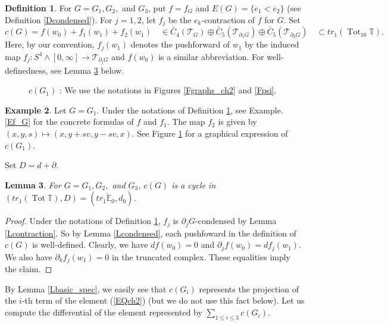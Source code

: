 \documentclass[reqno]{amsart}
\theoremstyle{definition}
\newtheorem{defi}{Definition}[section]
\newtheorem{exa}[defi]{Example}
\theoremstyle{plain}
\newtheorem{lem}[defi]{Lemma}
\newcommand{\TT}{\mathcal{T}} %
\newcommand{\CEE}{\check{\mathbb{E}}}
\newcommand{\TTH}{\mathbb{T}}%
\newcommand{\tot}{\operatorname{Tot}}%
\begin{document}
\begin{defi}\label{Dchain_ch2}
For $G=G_1,G_2,$ and $G_3$, put $f=f_G$ and $E(G)=\{e_1<e_2\}$ (see Definition \ref{Dcondensed}). For $j=1, 2$, let $f_j$ be the $e_k$-contraction of $f$ for $G$. 
Set
\[
c(G)=f(w_0)+f_{1}(w_1)+f_{2}(w_1)\quad \in \bar C_4(\TT_{G})\oplus \bar C_5(\TT_{\partial_1G})\oplus \bar C_5(\TT_{\partial_2G})\quad \subset tr_1(\tot_{10}\TTH).
\]
Here, by our convention, $f_j(w_1)$ denotes the pushforward of $w_1$ by the induced map $f_j:S^4\wedge[0,\infty]\to \TT_{\partial_jG}$ and $f(w_0)$ is a similar abbreviation. For well-definedness, see Lemma \ref{L1st_cyc_ch2} below.
\end{defi}

\begin{figure}
\begin{center}

\end{center}
\caption{$c(G_1)$ : We use the notations in Figures \ref{Fgraphs_ch2} and \ref{Fpsi}. }\label{Fc(G_1)}
\end{figure}
\begin{exa}
Let $G=G_1$. Under the notations of Definition \ref{Dchain_ch2}, see Example.\ref{Ef_G} for the concrete formulas of $f$ and $f_1$. The map $f_2$ is given by $(x,y,s)\mapsto (x,y+sv,y-sv,x)$. See Figure \ref{Fc(G_1)} for a graphical expression of $c(G_1)$.
\end{exa}

Set $D=d+\partial$. 
\begin{lem}\label{L1st_cyc_ch2}
For $G=G_1,G_2,$ and $G_3$, $c(G)$ is a cycle in $(tr_1(\tot\TTH), D)=(tr_1\CEE_0,d_0)$.
\end{lem}
\begin{proof}
Under the notations of Definition \ref{Dchain_ch2},  $f_j$ is $\partial_jG$-condensed by Lemma \ref{Lcontraction}. So by Lemma \ref{Lcondensed}, each pushfoward in the definition of $c(G)$ is well-defined. Clearly, we have $df(w_0)=0$ and $\partial_jf(w_0)=df_j(w_1)$. We also have $\partial_kf_j(w_1)=0$ in the truncated complex. These equalities imply the claim. 
\end{proof}
By Lemma \ref{Lbasic_spec}, we easily see that  $c(G_i)$ represents the projection of the $i$-th term of the element (\ref{EQch2}) (but we do not use this fact below).  Let us compute the differential of the element represented by $\sum_{1\leq i\leq 3}c(G_i)$.
\end{document}
